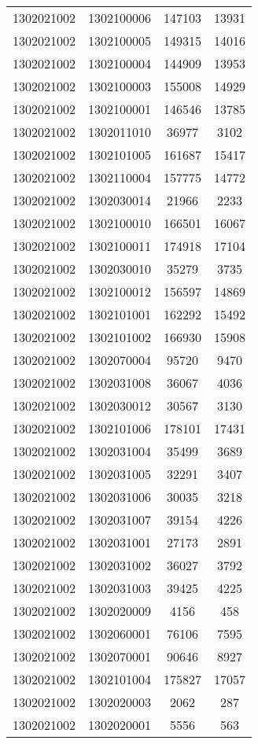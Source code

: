 \begin{longtable}{llcc}
1302021002 & 1302100006 & 147103 & 13931\\
1302021002 & 1302100005 & 149315 & 14016\\
1302021002 & 1302100004 & 144909 & 13953\\
1302021002 & 1302100003 & 155008 & 14929\\
1302021002 & 1302100001 & 146546 & 13785\\
1302021002 & 1302011010 & 36977 & 3102\\
1302021002 & 1302101005 & 161687 & 15417\\
1302021002 & 1302110004 & 157775 & 14772\\
1302021002 & 1302030014 & 21966 & 2233\\
1302021002 & 1302100010 & 166501 & 16067\\
1302021002 & 1302100011 & 174918 & 17104\\
1302021002 & 1302030010 & 35279 & 3735\\
1302021002 & 1302100012 & 156597 & 14869\\
1302021002 & 1302101001 & 162292 & 15492\\
1302021002 & 1302101002 & 166930 & 15908\\
1302021002 & 1302070004 & 95720 & 9470\\
1302021002 & 1302031008 & 36067 & 4036\\
1302021002 & 1302030012 & 30567 & 3130\\
1302021002 & 1302101006 & 178101 & 17431\\
1302021002 & 1302031004 & 35499 & 3689\\
1302021002 & 1302031005 & 32291 & 3407\\
1302021002 & 1302031006 & 30035 & 3218\\
1302021002 & 1302031007 & 39154 & 4226\\
1302021002 & 1302031001 & 27173 & 2891\\
1302021002 & 1302031002 & 36027 & 3792\\
1302021002 & 1302031003 & 39425 & 4225\\
1302021002 & 1302020009 & 4156 & 458\\
1302021002 & 1302060001 & 76106 & 7595\\
1302021002 & 1302070001 & 90646 & 8927\\
1302021002 & 1302101004 & 175827 & 17057\\
1302021002 & 1302020003 & 2062 & 287\\
1302021002 & 1302020001 & 5556 & 563\\

\end{longtable}
